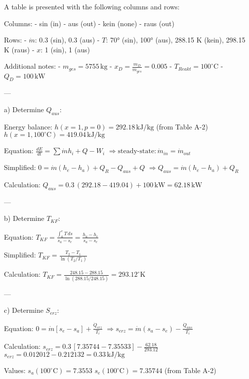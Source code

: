 A table is presented with the following columns and rows:  

Columns:  
- sin (in)  
- aus (out)  
- kein (none)  
- raus (out)  

Rows:  
- \( \dot{m} \): 0.3 (sin), 0.3 (aus)  
- \( T \): 70° (sin), 100° (aus), 288.15 K (kein), 298.15 K (raus)  
- \( x \): 1 (sin), 1 (aus)  

Additional notes:  
- \( m_{ges} = 5755 \, \text{kg} \)  
- \( x_D = \frac{m_D}{m_{ges}} = 0.005 \)  
- \( T_{Reakt} = 100^\circ \text{C} \)  
- \( Q_D = 100 \, \text{kW} \)  

---

a) Determine \( Q_{aus} \):  

Energy balance:  
\( h(x=1, p=0) = 292.18 \, \text{kJ/kg} \) (from Table A-2)  
\( h(x=1, 100^\circ \text{C}) = 419.04 \, \text{kJ/kg} \)  

Equation:  
\( \frac{dE}{dt} = \sum \dot{m} h_i + Q - W_i \)  
\( \Rightarrow \text{steady-state:} \, \dot{m}_{in} = \dot{m}_{out} \)  

Simplified:  
\( 0 = \dot{m}(h_e - h_a) + Q_R - Q_{aus} + Q \)  
\( \Rightarrow Q_{aus} = \dot{m}(h_e - h_a) + Q_R \)  

Calculation:  
\( Q_{aus} = 0.3 \, (292.18 - 419.04) + 100 \, \text{kW} = 62.18 \, \text{kW} \)  

---

b) Determine \( T_{KF} \):  

Equation:  
\( T_{KF} = \frac{\int_a^e T \, ds}{s_a - s_e} = \frac{h_a - h_e}{s_a - s_e} \)  

Simplified:  
\( T_{KF} = \frac{T_2 - T_1}{\ln(T_2/T_1)} \)  

Calculation:  
\( T_{KF} = \frac{248.15 - 288.15}{\ln(288.15/248.15)} = 293.12^\circ \text{K} \)  

---

c) Determine \( S_{erz} \):  

Equation:  
\( 0 = \dot{m}[s_e - s_a] + \frac{\dot{Q}_{erz}}{T_i} \)  
\( \Rightarrow s_{erz} = \dot{m}(s_a - s_e) - \frac{\dot{Q}_{aus}}{T_i} \)  

Calculation:  
\( s_{erz} = 0.3 \, [7.35744 - 7.35533] - \frac{62.18}{293.12} \)  
\( s_{erz} = 0.012012 - 0.212132 = 0.33 \, \text{kJ/kg} \)  

Values:  
\( s_a(100^\circ \text{C}) = 7.3553 \)  
\( s_e(100^\circ \text{C}) = 7.35744 \) (from Table A-2)